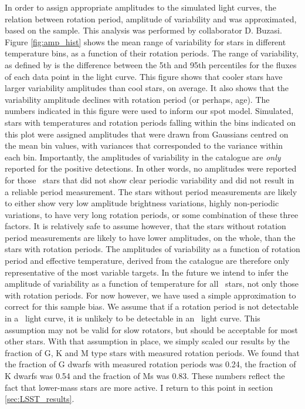 In order to assign appropriate amplitudes to the simulated light curves,
the relation between rotation period, amplitude of variability
and \teff was approximated, based on the \citet{Mcquillan2014} sample.
This analysis was performed by collaborator D. Buzasi.
Figure \ref{fig:amp_hist} shows the mean range of variability for stars in
different temperature bins, as a function of their rotation periods.
The range of variability, as defined by \citet{Mcquillan2014} is the
difference between the 5th and 95th percentiles for the fluxes of each data
point in the light curve.
This figure shows that cooler stars have larger variability amplitudes than
cool stars, on average.
It also shows that the variability amplitude declines with rotation period
(or perhaps, age).
The numbers indicated in this figure were used to inform our spot model.
Simulated, \trilegal stars with temperatures and rotation periods falling
within the bins indicated on this plot were assigned amplitudes that were
drawn from Gaussians centred on the mean bin values, with variances that
corresponded to the variance within each bin.
Importantly, the amplitudes of variability in the \citet{Mcquillan2014}
catalogue are {\it only} reported for the positive detections.
In other words, no amplitudes were reported for those \kepler\ stars that did
not show clear periodic variability and did not result in a reliable period
measurement.
The stars without period measurements are likely to either show very low
amplitude brightness variations, highly non-periodic variations, to have very
long rotation periods, or some combination of these three factors.
It is relatively safe to assume however, that the stars without rotation
period measurements are likely to have lower amplitudes, on the whole, than
the stars with rotation periods.
The amplitudes of variability as a function of rotation period and effective
temperature, derived from the \citet{Mcquillan2014} catalogue are therefore
only representative of the most variable targets.
In the future we intend to infer the amplitude of variability as a function of
temperature for all \kepler\ stars, not only those with rotation periods.
For now however, we have used a simple approximation to correct for this
sample bias.
We assume that if a rotation period is not detectable in a \kepler\ light
curve, it is unlikely to be detectable in an \LSST\ light curve.
This assumption may not be valid for slow rotators, but should be acceptable
for most other stars.
With that assumption in place, we simply scaled our results by the fraction of
G, K and M type stars with measured rotation periods.
We found that the fraction of G dwarfs with measured rotation periods was
0.24, the fraction of K dwarfs was 0.54 and the fraction of Ms was 0.83.
These numbers reflect the fact that lower-mass stars are more active.
I return to this point in section \textsection\ref{sec:LSST_results}.

